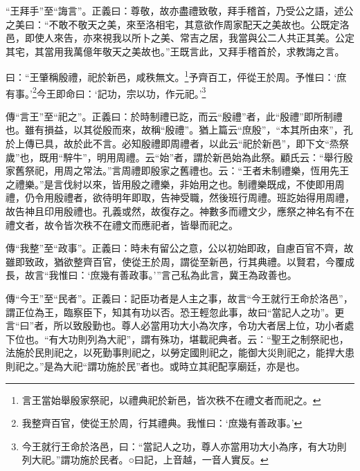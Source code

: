 {\noindent\shu{}\fzkt “王拜手”至“誨言”。正義曰：尊敬，故亦盡禮致敬，拜手稽首，乃受公之語，述公之美曰：“不敢不敬天之美，來至洛相宅，其意欲作周家配天之美故也。公既定洛邑，即使人來告，亦來視我以所卜之美、常吉之居，我當與公二人共正其美。公定其宅，其當用我萬億年敬天之美故也。”王既言此，又拜手稽首於，求教誨之言。 \par}

曰：“王肇稱殷禮，祀於新邑，咸秩無文。\footnote{言王當始舉殷家祭祀，以禮典祀於新邑，皆次秩不在禮文者而祀之。}予齊百工，伻從王於周。予惟曰：‘庶有事。’\footnote{我整齊百官，使從王於周，行其禮典。我惟曰：‘庶幾有善政事。’}今王即命曰：‘記功，宗以功，作元祀。’\footnote{今王就行王命於洛邑，曰：“當記人之功，尊人亦當用功大小為序，有大功則列大祀。”謂功施於民者。○曰記，上音越，一音人實反。}


{\noindent\zhuan{}\fzbyks 傳“言王”至“祀之”。正義曰：於時制禮已訖，而云“殷禮”者，此“殷禮”即所制禮也。雖有損益，以其從殷而來，故稱“殷禮”。猶上篇云“庶殷”，“本其所由來”，孔於上傳已具，故於此不言。必知殷禮即周禮者，以此云“祀於新邑”，即下文“烝祭歲”也，既用“騂牛”，明用周禮。云“始”者，謂於新邑始為此祭。顧氏云：“舉行殷家舊祭祀，用周之常法。”言周禮即殷家之舊禮也。云：“王者未制禮樂，恆用先王之禮樂。”是言伐紂以來，皆用殷之禮樂，非始用之也。制禮樂既成，不使即用周禮，仍令用殷禮者，欲待明年即取，告神受職，然後班行周禮。班訖始得用周禮，故告神且印用殷禮也。孔義或然，故復存之。神數多而禮文少，應祭之神名有不在禮文者，故令皆次秩不在禮文而應祀者，皆舉而祀之。 \par}

{\noindent\zhuan{}\fzbyks 傳“我整”至“政事”。正義曰：時未有留公之意，公以初始即政，自慮百官不齊，故雖即致政，猶欲整齊百官，使從王於周，謂從至新邑，行其典禮。以賢君，今覆成長，故言“我惟曰：‘庶幾有善政事。’”言己私為此言，冀王為政善也。 \par}

{\noindent\zhuan{}\fzbyks 傳“今王”至“民者”。正義曰：記臣功者是人主之事，故言“今王就行王命於洛邑”，謂正位為王，臨察臣下，知其有功以否。恐王輕忽此事，故曰“當記人之功”。更言“曰”者，所以致殷勤也。尊人必當用功大小為次序，令功大者居上位，功小者處下位也。“有大功則列為大祀”，謂有殊功，堪載祀典者。云：“聖王之制祭祀也，法施於民則祀之，以死勤事則祀之，以勞定國則祀之，能御大災則祀之，能捍大患則祀之。”是為大祀“謂功施於民”者也。或時立其祀配享廟廷，亦是也。 \par}

